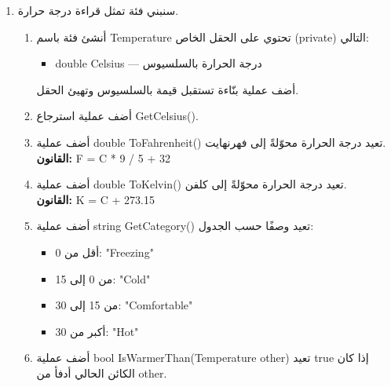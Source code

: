 \documentclass[14pt]{extarticle}
\begin{document}
\begin{enumerate}[itemsep=2em]
\begin{boxSolution}
\begin{english}
\begin{verbatim}
m1.Print();
m2.Print();

m1.SetRating(7.5);
Console.WriteLine("Is m1 highly rated? " + m1.IsHighlyRated());
\end{verbatim}
\end{english}
\end{boxSolution}
\fi
\clearpage


\item
سنبني فئة تمثل قراءة درجة حرارة.
\begin{enumerate}[itemsep=1em]
    \item أنشئ فئة باسم \textenglish{Temperature} تحتوي على الحقل الخاص (\textenglish{private}) التالي:
    \begin{itemize}[itemsep=1pt]
        \item \textenglish{double Celsius} — درجة الحرارة بالسلسيوس
    \end{itemize}
    أضف عملية بنّاءة تستقبل قيمة بالسلسيوس وتهيئ الحقل.

    \item أضف عملية استرجاع \textenglish{GetCelsius()}.

    \item أضف عملية \textenglish{double ToFahrenheit()} تعيد درجة الحرارة محوّلةً إلى فهرنهايت.\\
    \textbf{القانون:} \textenglish{F = C * 9 / 5 + 32}

    \item أضف عملية \textenglish{double ToKelvin()} تعيد درجة الحرارة محوّلةً إلى كلفن.\\
    \textbf{القانون:} \textenglish{K = C + 273.15}

    \item أضف عملية \textenglish{string GetCategory()} تعيد وصفًا حسب الجدول:
    \begin{itemize}[itemsep=1pt]
        \item أقل من \textenglish{0}: \textenglish{"Freezing"}
        \item من \textenglish{0} إلى \textenglish{15}: \textenglish{"Cold"}
        \item من \textenglish{15} إلى \textenglish{30}: \textenglish{"Comfortable"}
        \item أكبر من \textenglish{30}: \textenglish{"Hot"}
    \end{itemize}

    \item أضف عملية \textenglish{bool IsWarmerThan(Temperature other)} تعيد \textenglish{true} إذا كان الكائن الحالي أدفأ من \textenglish{other}.


\end{enumerate}
\end{enumerate}
\end{document}
